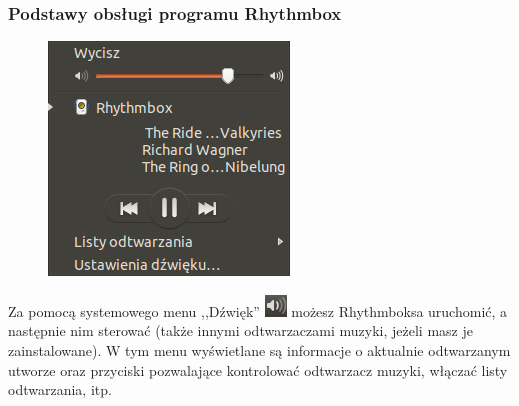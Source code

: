 \subsubsection{Podstawy obsługi programu Rhythmbox}
\begin{figure}
	\vspace{-10pt}
	\includegraphics[width=\linewidth]{images/programy_rhythmbox2.png}
\end{figure}

Za pomocą systemowego menu ,,Dźwięk'' \includegraphics{images/ikony_dzwiek.png} możesz Rhythmboksa uruchomić, a następnie nim sterować (także innymi odtwarzaczami muzyki, jeżeli masz je zainstalowane). W tym menu wyświetlane są informacje o aktualnie odtwarzanym utworze oraz przyciski pozwalające kontrolować odtwarzacz muzyki, włączać listy odtwarzania, itp.

